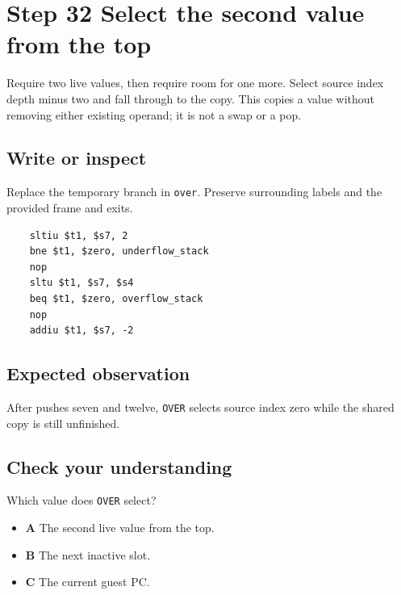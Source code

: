 \section{Step 32 Select the second value from the top}\label{vm-s32}

Require two live values, then require room for one more. Select source index depth minus two and fall through to the copy. This copies a value without removing either existing operand; it is not a swap or a pop.

\subsection{Write or inspect}
Replace the temporary branch in \texttt{over}. Preserve surrounding labels and the provided frame and exits.

\begin{verbatim}
    sltiu $t1, $s7, 2
    bne $t1, $zero, underflow_stack
    nop
    sltu $t1, $s7, $s4
    beq $t1, $zero, overflow_stack
    nop
    addiu $t1, $s7, -2
\end{verbatim}
\subsection{Expected observation}
After pushes seven and twelve, \texttt{OVER} selects source index zero while the shared copy is still unfinished.

\subsection{Check your understanding}
Which value does \texttt{OVER} select?

\begin{itemize}
  \item \textbf{A} The second live value from the top.
  \item \textbf{B} The next inactive slot.
  \item \textbf{C} The current guest PC.
\end{itemize}
